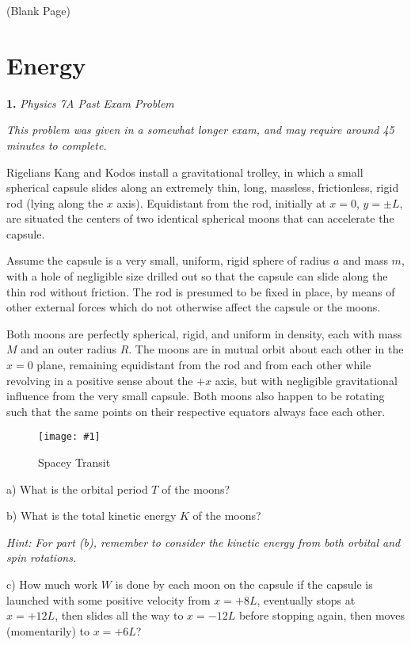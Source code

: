 \documentclass[11pt]{article}
\newcommand{\fig}[4]{
    \begin{figure}[H]
        \centering
        \texttt{[image: \#1]}
        \caption{#2}
        \label{exp4fit}
    \end{figure}
}
\theoremstyle{gangnamstyle}{\newtheorem{definition}{Definition}[]}
\theoremstyle{gangnamstyle}{\newtheorem{example}{Example}[]}
\theoremstyle{gangnamstyle}{\newtheorem{problem}{Problem}[]}
\begin{document}
\pagebreak

\begin{center}
(Blank Page)
\end{center}

\pagebreak

\section{Energy}

\textbf{1.} \textit{Physics 7A Past Exam Problem}

\textit{This problem was given in a somewhat longer exam, and may require around 45 minutes to complete.}

Rigelians Kang and Kodos install a gravitational trolley, in which a small spherical capsule slides along an extremely thin, long, massless, frictionless, rigid rod (lying along the $x$ axis). Equidistant from the rod, initially at $x = 0$, $y = \pm L$, are situated the centers of two identical spherical moons that can accelerate the capsule. 

Assume the capsule is a very small, uniform, rigid sphere of radius $a$ and mass $m$, with a hole of negligible size drilled out so that the capsule can slide along the thin rod without friction. The rod is presumed to be fixed in place, by means of other external forces which do not otherwise affect the capsule or the moons. 

Both moons are perfectly spherical, rigid, and uniform in density, each with mass $M$ and an outer radius $R$. The moons are in mutual orbit about each other in the $x = 0$ plane, remaining equidistant from the rod and from each other while revolving in a positive sense about the $+x$ axis, but with negligible gravitational influence from the very small capsule. Both moons also happen to be rotating such that the same points on their respective equators always face each other.

\fig{figs/mt2/charman2.png}{Spacey Transit}{0.55}{0}

a) What is the orbital period $T$ of the moons?

b) What is the total kinetic energy $K$ of the moons?

\textit{Hint: For part (b), remember to consider the kinetic energy from both orbital and spin rotations. }

c) How much work $W$ is done by each moon on the capsule if the capsule is launched with some positive velocity from $x = +8L$, eventually stops at $x = +12L$, then slides all the way to $x = -12L$ before stopping again, then moves (momentarily) to $x = +6L$? 
\end{document}
